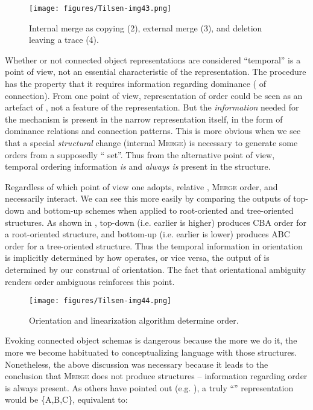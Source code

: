   
\begin{figure}
\texttt{[image: figures/Tilsen-img43.png]}
\caption{Internal merge as copying (2), external merge (3), and deletion leaving a trace (4).}
\label{fig:3:15}
\end{figure}
 

  Whether or not connected object representations are considered “temporal” is a point of view, not an essential characteristic of the representation. The  procedure has the property that it requires information regarding dominance ( of connection). From one point of view, representation of order could be seen as an artefact of , not a feature of the  representation. But the \textit{information} needed for the  mechanism is present in the narrow representation itself, in the form of dominance relations and connection patterns. This is more obvious when we see that a special \textit{structural} change (internal \textsc{Merge}) is necessary to generate some orders from a supposedly “ set”. Thus from the alternative point of view, temporal ordering information \textit{is} and \textit{always is} present in the structure. 

  Regardless of which point of view one adopts, relative , \textsc{Merge} order, and  necessarily interact. We can see this more easily by comparing the outputs of top-down and bottom-up  schemes when applied to root-oriented and tree-oriented structures. As shown in {}, top-down  (i.e. earlier is higher) produces CBA order for a root-oriented structure, and bottom-up  (i.e. earlier is lower) produces ABC order for a tree-oriented structure. Thus the temporal information in orientation is implicitly determined by how  operates, or vice versa, the output of  is determined by our construal of orientation. The fact that orientational ambiguity renders order ambiguous reinforces this point.

  
\begin{figure}
\texttt{[image: figures/Tilsen-img44.png]}
\caption{Orientation and linearization algorithm determine order.}
\label{fig:3:16}
\end{figure}
 

  Evoking connected object schemas is dangerous because the more we do it, the more we become habituated to conceptualizing language with those structures. Nonetheless, the above discussion was necessary because it leads to the conclusion that \textsc{Merge} does not produce  structures -- information regarding order is always present. As others have pointed out (e.g. \citealt{Yang1999}), a truly “” representation would be \{A,B,C\}, equivalent to:\\

